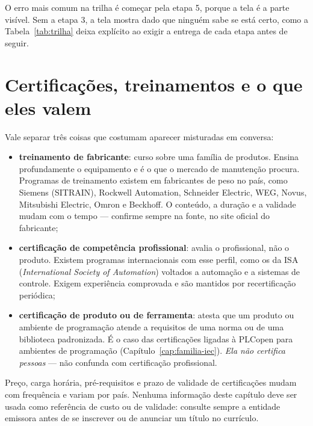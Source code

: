 O erro mais comum na trilha é começar pela etapa 5, porque a tela é a parte visível. Sem a etapa 3,
a tela mostra dado que ninguém sabe se está certo, como a Tabela~\ref{tab:trilha} deixa explícito ao
exigir a entrega de cada etapa antes de seguir.

\section{Certificações, treinamentos e o que eles valem}

Vale separar três coisas que costumam aparecer misturadas em conversa:

\begin{itemize}
  \item \textbf{treinamento de fabricante}: curso sobre uma família de produtos. Ensina profundamente
        o equipamento e é o que o mercado de manutenção procura. Programas de treinamento existem em
        fabricantes de peso no país, como Siemens (SITRAIN), Rockwell Automation, Schneider Electric,
        WEG, Novus, Mitsubishi Electric, Omron e Beckhoff. O conteúdo, a duração e a validade mudam
        com o tempo --- confirme sempre na fonte, no site oficial do fabricante;
  \item \textbf{certificação de competência profissional}: avalia o profissional, não o produto.
        Existem programas internacionais com esse perfil, como os da ISA (\emph{International Society
        of Automation}) voltados a automação e a sistemas de controle. Exigem experiência comprovada
        e são mantidos por recertificação periódica;
  \item \textbf{certificação de produto ou de ferramenta}: atesta que um produto ou ambiente de
        programação atende a requisitos de uma norma ou de uma biblioteca padronizada. É o caso das
        certificações ligadas à PLCopen para ambientes de programação (Capítulo~\ref{cap:familia-iec}).
        \emph{Ela não certifica pessoas} --- não confunda com certificação profissional.
\end{itemize}

\begin{atencao}
Preço, carga horária, pré-requisitos e prazo de validade de certificações mudam com frequência e
variam por país. Nenhuma informação deste capítulo deve ser usada como referência de custo ou de
validade: consulte sempre a entidade emissora antes de se inscrever ou de anunciar um título no
currículo.
\end{atencao}

